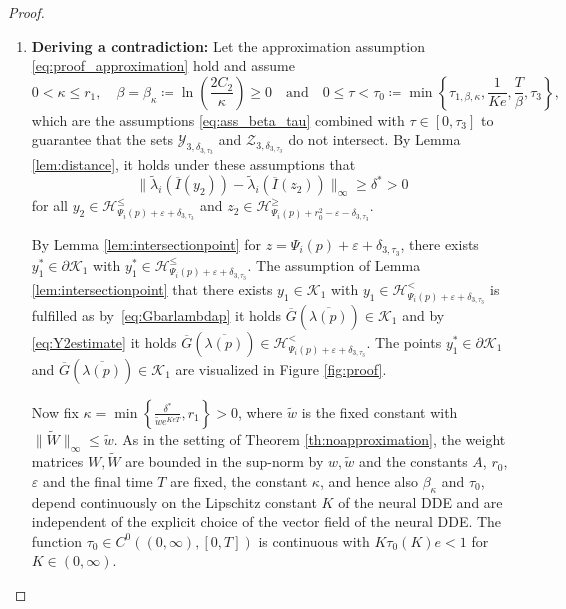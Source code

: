 \documentclass[10pt]{article}
\numberwithin{equation}{section}
\newcommand{\eps}{\varepsilon}
\newcommand\normm[1]{\big\lVert#1\big\lVert}
\begin{document}
\begin{proof}
\begin{enumerate}
			
			\item \textbf{Deriving a contradiction:} Let the approximation assumption \eqref{eq:proof_approximation} hold and assume
			\begin{equation} \label{eq:ass_beta_tau_2}
				0<\kappa \leq r_1, \quad \beta=\beta_\kappa \coloneqq \ln\left(\frac{2C_2}{\kappa}\right)\geq 0 \quad \text{and} \quad 0\leq \tau< \tau_0 \coloneqq \min\left\{\tau_{1,\beta,\kappa},\frac{1}{Ke},\frac{T}{\beta},\tau_3\right\},
			\end{equation}
			which are the assumptions \eqref{eq:ass_beta_tau} combined with $\tau\in[0,\tau_3]$ to guarantee that the sets $\mathcal{Y}_{3,\delta_{3,\tau_3}}$ and $\mathcal{Z}_{3,\delta_{3,\tau_3}}$ do not intersect. By Lemma \ref{lem:distance}, it holds under these assumptions that
			\begin{equation}\label{eq:distance}
				\normm{\tilde{\lambda}_i(\overline{I}(y_2))-\tilde{\lambda}_i(\overline{I}(z_2))}_\infty \geq
				\delta^\ast > 0
			\end{equation}
			for all $y_2\in	\mathcal{H}^{\leq}_{\Psi_i(p)+\eps+\delta_{3,\tau_3}}$  and $z_2\in\mathcal{H}^{\geq}_{\Psi_i(p)+r_0^2-\eps-\delta_{3,\tau_3}}$. 
			
			By Lemma \ref{lem:intersectionpoint} for $z = \Psi_i(p)+\eps+\delta_{3,\tau_3}$, there exists $y_1^\ast \in \partial \mathcal{K}_1$ with  $y_1^\ast \in \mathcal{H}^{\leq}_{\Psi_i(p)+\eps+\delta_{3,\tau_3}}$. The assumption of Lemma \ref{lem:intersectionpoint} that there exists $y_1\in \mathcal{K}_1$ with $y_1\in\mathcal{H}^{<}_{\Psi_i(p)+\eps+\delta_{3,\tau_3}}$ is fulfilled as by~\eqref{eq:Gbarlambdap} it holds $\overline{G}(\overline{\lambda(p)}) \in\mathcal{K}_1$ and by \eqref{eq:Y2estimate} it holds $\overline{G}(\overline{\lambda(p)}) \in\mathcal{H}^{<}_{\Psi_i(p)+\eps+\delta_{3,\tau_3}}$. The points $y_1^\ast \in \partial \mathcal{K}_1$ and $\overline{G}(\overline{\lambda(p)}) \in\mathcal{K}_1$ are visualized in Figure \ref{fig:proof}.
			
			Now fix $\kappa = \min\left\{\frac{\delta^\ast}{\tilde w e^{KeT}},r_1\right\}>0$, where $\tilde w$ is the fixed constant with $\normm{\widetilde W}_\infty \leq \tilde w$. As in the setting of Theorem \ref{th:noapproximation}, the weight matrices $W, \widetilde{W}$ are bounded in the sup-norm by $w, \tilde w$ and the constants $A$, $r_0$, $\eps$ and the final time $T$ are fixed, the constant $\kappa$, and hence also $\beta_\kappa$ and $\tau_0$, depend continuously on the Lipschitz constant $K$ of the neural DDE and are independent of the explicit choice of the vector field of the neural DDE. The function $\tau_0\in C^0((0,\infty),[0,T])$ is continuous with $K \tau_0(K) e<1$ for $K\in(0,\infty)$. 
			

\end{enumerate}
\end{proof}
\end{document}
